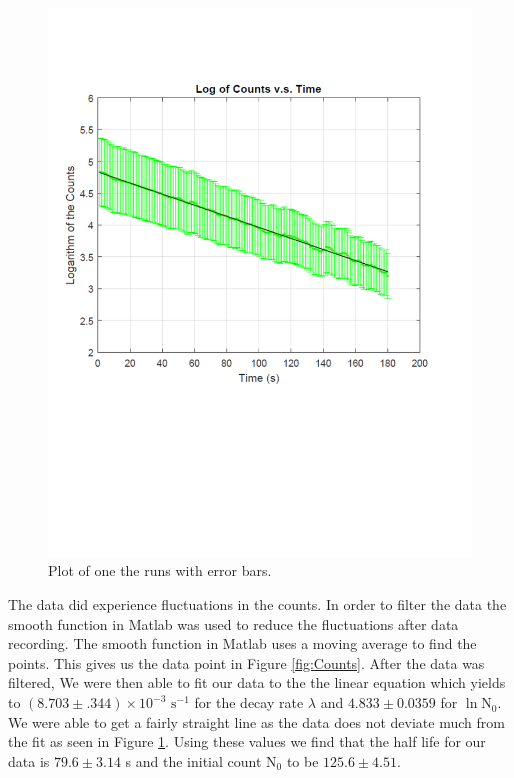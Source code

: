 \documentclass[11pt,letterpaper,onecolumn]{article}
\begin{document}
\begin{figure}[H]
\begin{center}
\includegraphics*[scale = .6]{LogCnt.pdf}
\caption{Plot of one the runs with error bars.~\label{fig:results} }
\end{center}
\end{figure}

The data did experience fluctuations in the counts. In order to filter the data the smooth function in Matlab was used to reduce the fluctuations after data recording. The smooth function in Matlab uses a moving average to find the points. This gives us the data point in Figure \ref{fig:Counts}. After the data was filtered, We were then able to fit our data to the the linear equation which yields to $(8.703\pm.344)\times10^{-3} \text{ s}^{-1}$ for the decay rate $\lambda$ and $4.833\pm0.0359$ for $\ln{\text{N}_0}$. We were able to get a fairly straight line as the data does not deviate much from the fit as seen in Figure \ref{fig:results}. Using these values we find that the half life for our data is $79.6\pm3.14$ s and the initial count $\text{N}_0$ to be $125.6\pm4.51$. 
\end{document}
